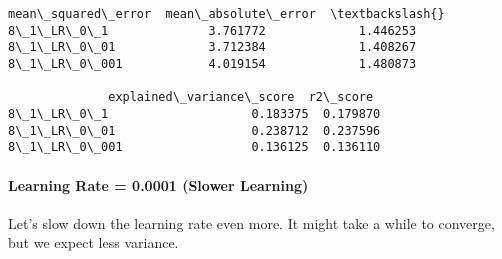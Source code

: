 \documentclass[11pt]{article}
\makeatletter
\newcommand{\boxspacing}{\kern\kvtcb@left@rule\kern\kvtcb@boxsep}
\newcommand{\prompt}[4]{
        {\ttfamily\llap{{\color{#2}[#3]:\hspace{3pt}#4}}\vspace{-\baselineskip}}
    }
\makeatother
\begin{document}
            \begin{tcolorbox}[breakable, size=fbox, boxrule=.5pt, pad at break*=1mm, opacityfill=0]
\prompt{Out}{outcolor}{83}{\boxspacing}
\begin{Verbatim}[commandchars=\\\{\}]
              mean\_squared\_error  mean\_absolute\_error  \textbackslash{}
8\_1\_LR\_0\_1              3.761772             1.446253
8\_1\_LR\_0\_01             3.712384             1.408267
8\_1\_LR\_0\_001            4.019154             1.480873

              explained\_variance\_score  r2\_score
8\_1\_LR\_0\_1                    0.183375  0.179870
8\_1\_LR\_0\_01                   0.238712  0.237596
8\_1\_LR\_0\_001                  0.136125  0.136110
\end{Verbatim}
\end{tcolorbox}
        
    \paragraph{Learning Rate = 0.0001 (Slower
Learning)}\label{learning-rate-0.0001-slower-learning}

Let's slow down the learning rate even more. It might take a while to
converge, but we expect less variance.
\end{document}
